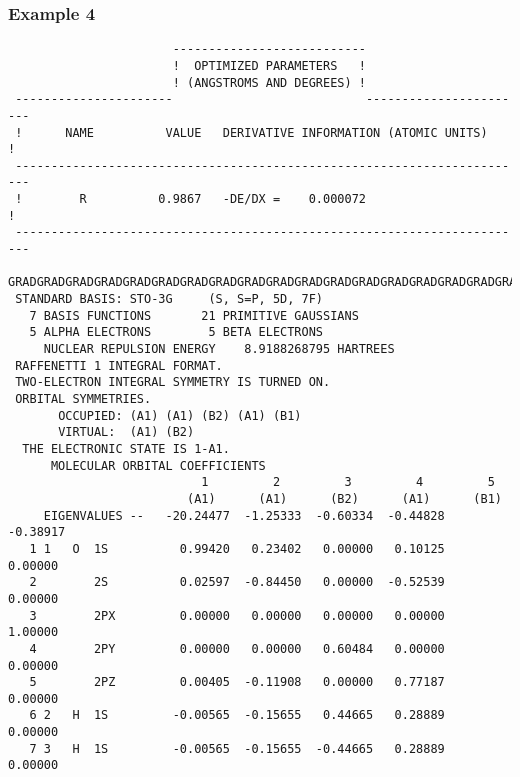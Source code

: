 \subsubsection{\sf Example 4}
{\small
\begin{verbatim}
                       ---------------------------
                       !  OPTIMIZED PARAMETERS   !
                       ! (ANGSTROMS AND DEGREES) !
 ----------------------                           -----------------------
 !      NAME          VALUE   DERIVATIVE INFORMATION (ATOMIC UNITS)     !
 ------------------------------------------------------------------------
 !        R          0.9867   -DE/DX =    0.000072                      !
 ------------------------------------------------------------------------
 GRADGRADGRADGRADGRADGRADGRADGRADGRADGRADGRADGRADGRADGRADGRADGRADGRADGRAD
 STANDARD BASIS: STO-3G     (S, S=P, 5D, 7F)
   7 BASIS FUNCTIONS       21 PRIMITIVE GAUSSIANS
   5 ALPHA ELECTRONS        5 BETA ELECTRONS
     NUCLEAR REPULSION ENERGY    8.9188268795 HARTREES
 RAFFENETTI 1 INTEGRAL FORMAT.
 TWO-ELECTRON INTEGRAL SYMMETRY IS TURNED ON.
 ORBITAL SYMMETRIES.
       OCCUPIED: (A1) (A1) (B2) (A1) (B1)
       VIRTUAL:  (A1) (B2)
  THE ELECTRONIC STATE IS 1-A1.
      MOLECULAR ORBITAL COEFFICIENTS
                           1         2         3         4         5
                         (A1)      (A1)      (B2)      (A1)      (B1)
     EIGENVALUES --   -20.24477  -1.25333  -0.60334  -0.44828  -0.38917
   1 1   O  1S          0.99420   0.23402   0.00000   0.10125   0.00000
   2        2S          0.02597  -0.84450   0.00000  -0.52539   0.00000
   3        2PX         0.00000   0.00000   0.00000   0.00000   1.00000
   4        2PY         0.00000   0.00000   0.60484   0.00000   0.00000
   5        2PZ         0.00405  -0.11908   0.00000   0.77187   0.00000
   6 2   H  1S         -0.00565  -0.15655   0.44665   0.28889   0.00000
   7 3   H  1S         -0.00565  -0.15655  -0.44665   0.28889   0.00000
\end{verbatim}
}
\newpage
